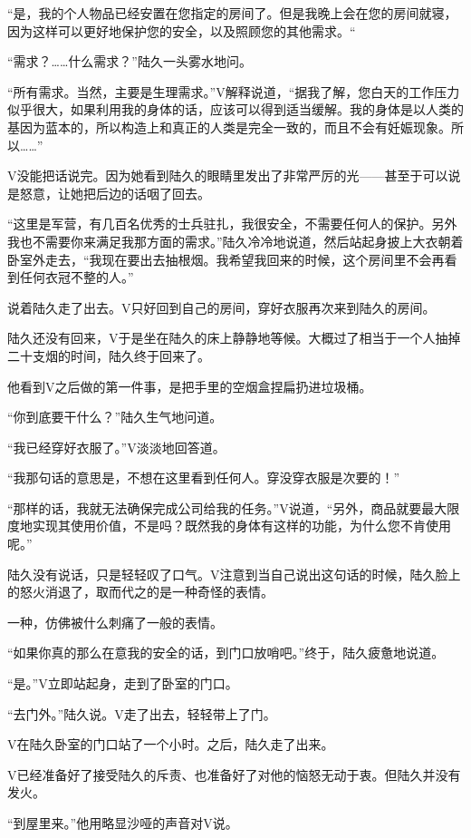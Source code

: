 “是，我的个人物品已经安置在您指定的房间了。但是我晚上会在您的房间就寝，因为这样可以更好地保护您的安全，以及照顾您的其他需求。“

“需求？……什么需求？”陆久一头雾水地问。

“所有需求。当然，主要是生理需求。”V解释说道，“据我了解，您白天的工作压力似乎很大，如果利用我的身体的话，应该可以得到适当缓解。我的身体是以人类的基因为蓝本的，所以构造上和真正的人类是完全一致的，而且不会有妊娠现象。所以……”

V没能把话说完。因为她看到陆久的眼睛里发出了非常严厉的光——甚至于可以说是怒意，让她把后边的话咽了回去。

“这里是军营，有几百名优秀的士兵驻扎，我很安全，不需要任何人的保护。另外我也不需要你来满足我那方面的需求。”陆久冷冷地说道，然后站起身披上大衣朝着卧室外走去，“我现在要出去抽根烟。我希望我回来的时候，这个房间里不会再看到任何衣冠不整的人。”

说着陆久走了出去。V只好回到自己的房间，穿好衣服再次来到陆久的房间。

陆久还没有回来，V于是坐在陆久的床上静静地等候。大概过了相当于一个人抽掉二十支烟的时间，陆久终于回来了。

他看到V之后做的第一件事，是把手里的空烟盒捏扁扔进垃圾桶。

“你到底要干什么？”陆久生气地问道。

“我已经穿好衣服了。”V淡淡地回答道。

“我那句话的意思是，不想在这里看到任何人。穿没穿衣服是次要的！”

“那样的话，我就无法确保完成公司给我的任务。”V说道，“另外，商品就要最大限度地实现其使用价值，不是吗？既然我的身体有这样的功能，为什么您不肯使用呢。”

陆久没有说话，只是轻轻叹了口气。V注意到当自己说出这句话的时候，陆久脸上的怒火消退了，取而代之的是一种奇怪的表情。

一种，仿佛被什么刺痛了一般的表情。

“如果你真的那么在意我的安全的话，到门口放哨吧。”终于，陆久疲惫地说道。

“是。”V立即站起身，走到了卧室的门口。

“去门外。”陆久说。V走了出去，轻轻带上了门。

V在陆久卧室的门口站了一个小时。之后，陆久走了出来。

V已经准备好了接受陆久的斥责、也准备好了对他的恼怒无动于衷。但陆久并没有发火。

“到屋里来。”他用略显沙哑的声音对V说。



\section*{}

